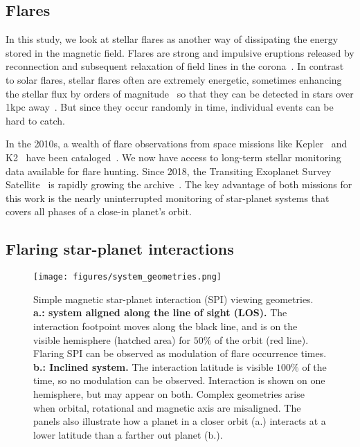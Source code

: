\documentclass[twocolumn]{aastex631}
\begin{document}
\subsection{Flares}
\label{sec:intro:flares}
In this study, we look at stellar flares as another way of dissipating the energy stored in the magnetic field. Flares are strong and impulsive eruptions released by reconnection and subsequent relaxation of field lines in the corona~\citep{svestka1976solar,priest2002magnetic}. In contrast to solar flares, stellar flares often are extremely energetic, sometimes enhancing the stellar flux by orders of magnitude~\citep{maehara2012superflares, shibayama2013superflares, paudel2018k2} so that they can be detected in stars over 1kpc away~\citep{chang2015photometric}. But since they occur randomly in time, individual events can be hard to catch. %

In the 2010s, a wealth of flare observations from space missions like Kepler~\citep{borucki2010kepler} and K2~\citep{howell2014k2} have been cataloged~\citep{davenport2016kepler, paudel2018k2, ilin2021flares}. We now have access to long-term stellar monitoring data available for flare hunting. Since 2018, the Transiting Exoplanet Survey Satellite~\citep{ricker2015transiting} is rapidly growing the archive~\citep{gunther2020stellar}. The key advantage of both missions for this work is the nearly uninterrupted monitoring of star-planet systems that covers all phases of a close-in planet's orbit.

\subsection{Flaring star-planet interactions}
\label{sec:intro:fspi}

\begin{figure}[ht!]
    \begin{centering}
        \texttt{[image: figures/system\_geometries.png]}
        \caption{
         Simple magnetic star-planet interaction (SPI) viewing geometries. \textbf{a.: system aligned along the line of sight (LOS). } The interaction footpoint moves along the black line, and is on the visible hemisphere (hatched area) for $50\%$ of the  orbit (red line). Flaring SPI can be observed as modulation of flare occurrence times. \textbf{b.: Inclined system.} The interaction latitude is visible $100\%$ of the time, so no modulation can be observed. Interaction is shown on one hemisphere, but may appear on both. Complex geometries arise when orbital, rotational and magnetic axis are misaligned. The panels also illustrate how a planet in a closer orbit (a.) interacts at a lower latitude than a farther out planet (b.). }
        \label{fig:sketch}
    \end{centering}
\end{figure}
\end{document}
